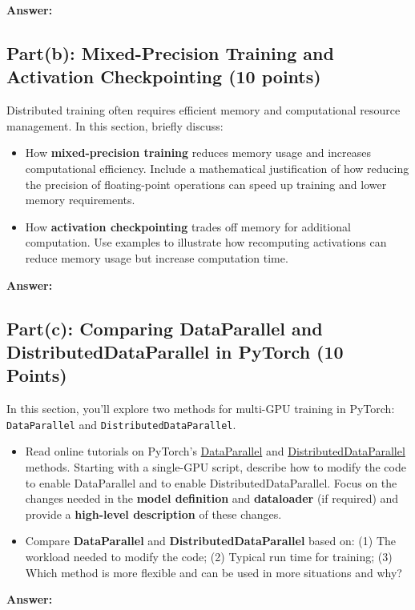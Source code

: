 \documentclass[11pt, oneside]{article}   	%
\begin{document}
\textbf{Answer:}

\subsection*{Part(b): Mixed-Precision Training and Activation Checkpointing (10 points)} 
Distributed training often requires efficient memory and computational resource management. In this section, briefly discuss:
\begin{itemize}
    \item How \textbf{mixed-precision training} reduces memory usage and increases computational efficiency. Include a mathematical justification of how reducing the precision of floating-point operations can speed up training and lower memory requirements.
    \item How \textbf{activation checkpointing} trades off memory for additional computation. Use examples to illustrate how recomputing activations can reduce memory usage but increase computation time.
\end{itemize}

\textbf{Answer:}

\subsection*{Part(c): Comparing DataParallel and DistributedDataParallel in PyTorch (10 Points)}
In this section, you'll explore two methods for multi-GPU training in PyTorch: \texttt{DataParallel} and \texttt{DistributedDataParallel}.
\begin{itemize}
    \item Read online tutorials on PyTorch's \href{https://pytorch.org/docs/stable/generated/torch.nn.DataParallel.html}{DataParallel} and \href{https://pytorch.org/tutorials/intermediate/ddp_tutorial.html}{DistributedDataParallel} methods. Starting with a single-GPU script, describe how to modify the code to enable DataParallel and to enable DistributedDataParallel. Focus on the changes needed in the \textbf{model definition} and \textbf{dataloader} (if required) and provide a \textbf{high-level description} of these changes.
    \item Compare \textbf{DataParallel} and \textbf{DistributedDataParallel} based on:  (1) The workload needed to modify the code; (2) Typical run time for training; (3) Which method is more flexible and can be used in more situations and why?
\end{itemize}

\textbf{Answer:}
\end{document}
